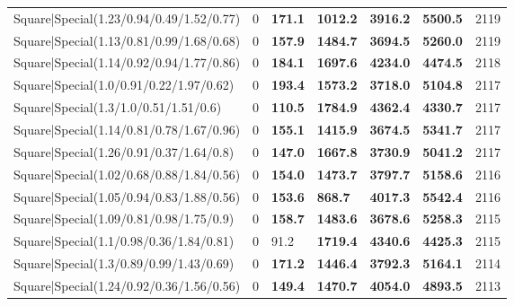 \begin{tabular}{lrllllr}
 Square|Special(1.23/0.94/0.49/1.52/0.77)                      &             0   & \textbf{171.1} & \textbf{1012.2} & \textbf{3916.2} & \textbf{5500.5} &         2119 \\
 Square|Special(1.13/0.81/0.99/1.68/0.68)                      &             0   & \textbf{157.9} & \textbf{1484.7} & \textbf{3694.5} & \textbf{5260.0} &         2119 \\
 Square|Special(1.14/0.92/0.94/1.77/0.86)                      &             0   & \textbf{184.1} & \textbf{1697.6} & \textbf{4234.0} & \textbf{4474.5} &         2118 \\
 Square|Special(1.0/0.91/0.22/1.97/0.62)                       &             0   & \textbf{193.4} & \textbf{1573.2} & \textbf{3718.0} & \textbf{5104.8} &         2117 \\
 Square|Special(1.3/1.0/0.51/1.51/0.6)                         &             0   & \textbf{110.5} & \textbf{1784.9} & \textbf{4362.4} & \textbf{4330.7} &         2117 \\
 Square|Special(1.14/0.81/0.78/1.67/0.96)                      &             0   & \textbf{155.1} & \textbf{1415.9} & \textbf{3674.5} & \textbf{5341.7} &         2117 \\
 Square|Special(1.26/0.91/0.37/1.64/0.8)                       &             0   & \textbf{147.0} & \textbf{1667.8} & \textbf{3730.9} & \textbf{5041.2} &         2117 \\
 Square|Special(1.02/0.68/0.88/1.84/0.56)                      &             0   & \textbf{154.0} & \textbf{1473.7} & \textbf{3797.7} & \textbf{5158.6} &         2116 \\
 Square|Special(1.05/0.94/0.83/1.88/0.56)                      &             0   & \textbf{153.6} & \textbf{868.7}  & \textbf{4017.3} & \textbf{5542.4} &         2116 \\
 Square|Special(1.09/0.81/0.98/1.75/0.9)                       &             0   & \textbf{158.7} & \textbf{1483.6} & \textbf{3678.6} & \textbf{5258.3} &         2115 \\
 Square|Special(1.1/0.98/0.36/1.84/0.81)                       &             0   & 91.2           & \textbf{1719.4} & \textbf{4340.6} & \textbf{4425.3} &         2115 \\
 Square|Special(1.3/0.89/0.99/1.43/0.69)                       &             0   & \textbf{171.2} & \textbf{1446.4} & \textbf{3792.3} & \textbf{5164.1} &         2114 \\
 Square|Special(1.24/0.92/0.36/1.56/0.56)                      &             0   & \textbf{149.4} & \textbf{1470.7} & \textbf{4054.0} & \textbf{4893.5} &         2113 \\

\end{tabular}
